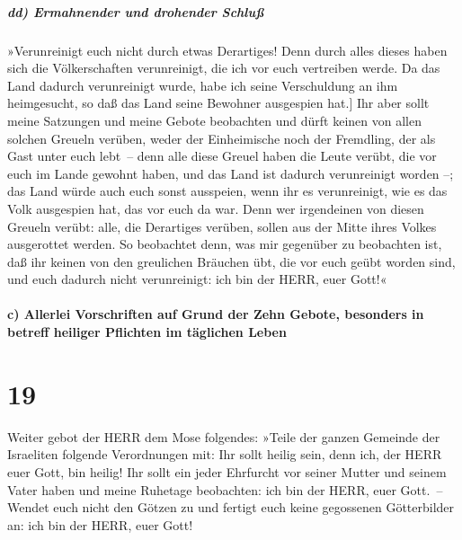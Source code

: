 \hypertarget{dd-ermahnender-und-drohender-schluuxdf}{%
\subparagraph{dd) Ermahnender und drohender
Schluß}\label{dd-ermahnender-und-drohender-schluuxdf}}

»Verunreinigt euch nicht durch etwas Derartiges! Denn
durch alles dieses haben sich die Völkerschaften verunreinigt, die ich
vor euch vertreiben werde. \bibleverse{25}{[}Da das Land dadurch
verunreinigt wurde, habe ich seine Verschuldung an ihm heimgesucht, so
daß das Land seine Bewohner ausgespien hat.{]} Ihr aber
sollt meine Satzungen und meine Gebote beobachten und dürft keinen von
allen solchen Greueln verüben, weder der Einheimische noch der
Fremdling, der als Gast unter euch lebt~-- denn alle
diese Greuel haben die Leute verübt, die vor euch im Lande gewohnt
haben, und das Land ist dadurch verunreinigt worden --;
das Land würde auch euch sonst ausspeien, wenn ihr es
verunreinigt, wie es das Volk ausgespien hat, das vor euch da war.
Denn wer irgendeinen von diesen Greueln verübt: alle, die
Derartiges verüben, sollen aus der Mitte ihres Volkes ausgerottet
werden. So beobachtet denn, was mir gegenüber zu
beobachten ist, daß ihr keinen von den greulichen Bräuchen übt, die vor
euch geübt worden sind, und euch dadurch nicht verunreinigt: ich bin der
HERR, euer Gott!«

\hypertarget{c-allerlei-vorschriften-auf-grund-der-zehn-gebote-besonders-in-betreff-heiliger-pflichten-im-tuxe4glichen-leben}{%
\paragraph{c) Allerlei Vorschriften auf Grund der Zehn Gebote, besonders
in betreff heiliger Pflichten im täglichen
Leben}\label{c-allerlei-vorschriften-auf-grund-der-zehn-gebote-besonders-in-betreff-heiliger-pflichten-im-tuxe4glichen-leben}}

\hypertarget{section-18}{%
\section{19}\label{section-18}}

Weiter gebot der HERR dem Mose folgendes:
»Teile der ganzen Gemeinde der Israeliten folgende
Verordnungen mit: Ihr sollt heilig sein, denn ich, der HERR euer Gott,
bin heilig! Ihr sollt ein jeder Ehrfurcht vor seiner
Mutter und seinem Vater haben und meine Ruhetage beobachten: ich bin der
HERR, euer Gott.~-- Wendet euch nicht den Götzen zu und
fertigt euch keine gegossenen Götterbilder an: ich bin der HERR, euer
Gott!

